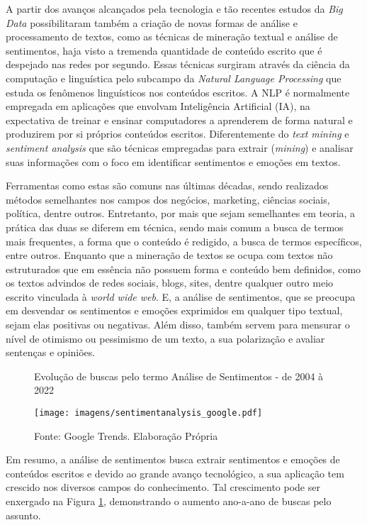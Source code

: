 A partir dos avanços alcançados pela tecnologia e tão recentes estudos da \textit{Big Data} possibilitaram também a criação de novas formas de análise e processamento de textos, como as técnicas de mineração textual e análise de sentimentos, haja visto a tremenda quantidade de conteúdo escrito que é despejado nas redes por segundo. Essas técnicas surgiram através da ciência da computação e linguística pelo subcampo da \textit{Natural Language Processing} que estuda os fenômenos linguísticos nos conteúdos escritos. A NLP é normalmente empregada em aplicações que envolvam Inteligência Artificial (IA), na expectativa de treinar e ensinar computadores a aprenderem de forma natural e produzirem por si próprios conteúdos escritos. Diferentemente do \textit{text mining} e \textit{sentiment analysis} que são técnicas empregadas para extrair (\textit{mining}) e analisar suas informações com o foco em identificar sentimentos e emoções em textos. 

Ferramentas como estas são comuns nas últimas décadas, sendo realizados métodos semelhantes nos campos dos negócios, marketing, ciências sociais, política, dentre outros. Entretanto, por mais que sejam semelhantes em teoria, a prática das duas se diferem em técnica, sendo mais comum a busca de termos mais frequentes, a forma que o conteúdo é redigido, a busca de termos específicos, entre outros. Enquanto que a mineração de textos se ocupa com textos não estruturados que em essência não possuem forma e conteúdo bem definidos, como os textos advindos de redes sociais, blogs, sites, dentre qualquer outro meio escrito vinculada à \textit{world wide web}. E, a análise de sentimentos, que se preocupa em desvendar os sentimentos e emoções exprimidos em qualquer tipo textual, sejam elas positivas ou negativas. Além disso, também servem para mensurar o nível de otimismo ou pessimismo de um texto, a sua polarização e avaliar sentenças e opiniões.

\begin{figure}[!h]
    \centering
    \caption{Evolução de buscas pelo termo Análise de Sentimentos - de 2004 à 2022}
    \texttt{[image: imagens/sentimentanalysis\_google.pdf]}
    \label{fig: sentiment}
    \caption*{Fonte: Google Trends. Elaboração Própria}
\end{figure}

Em resumo, a análise de sentimentos busca extrair sentimentos e emoções de conteúdos escritos e devido ao grande avanço tecnológico, a sua aplicação tem crescido nos diversos campos do conhecimento. Tal crescimento pode ser enxergado na Figura \ref{fig: sentiment}, demonstrando o aumento ano-a-ano de buscas pelo assunto. 

